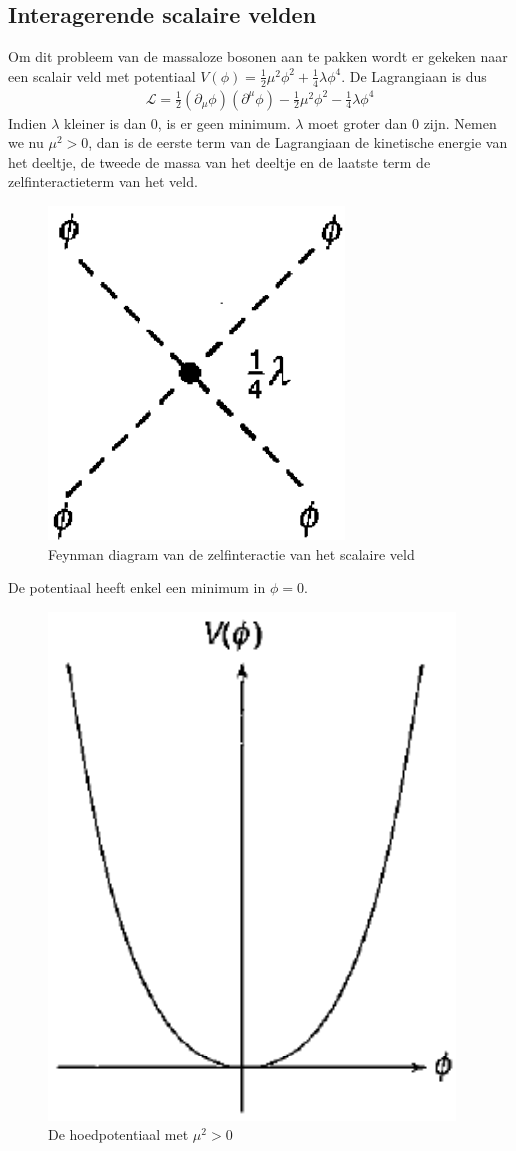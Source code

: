 \documentclass[../main.tex]{subfiles}
\begin{document}
\subsection{Interagerende scalaire velden}%
\label{sub:interagerende_scalaire_velden}

Om dit probleem van de massaloze bosonen aan te pakken wordt er gekeken naar een scalair veld met potentiaal $V(\phi) = \frac{1}{2}\mu^2\phi^2+\frac{1}{4}\lambda\phi^4$. De Lagrangiaan is dus
\begin{equation}
    \begin{aligned}
        \label{eq:lagr_hoed_pot}
        \mathcal{L} = \frac{1}{2} (\partial_\mu \phi) (\partial^\mu \phi) - \frac{1}{2} \mu^2 \phi^2 - \frac{1}{4} \lambda \phi^4
    \end{aligned}
\end{equation}
Indien $\lambda$ kleiner is dan 0, is er geen minimum. $\lambda$ moet groter dan 0 zijn. Nemen we nu $\mu^2>0$, dan is de eerste term van de Lagrangiaan de kinetische energie van het deeltje, de tweede de massa van het deeltje en de laatste term de zelfinteractieterm van het veld.\newpage

\begin{figure}[h]
    \centering
    \includegraphics[width=0.2\linewidth]{higgs_boson/zelf_int_term_scal.png}
    \caption{Feynman diagram van de zelfinteractie van het scalaire veld}%
    \label{fig:higgs_boson/zelf_int_term_scal}
\end{figure}

De potentiaal heeft enkel een minimum in $\phi=0$.

\begin{figure}[h]
    \centering
    \includegraphics[width=0.2\linewidth]{higgs_boson/hoed_pot_1.png}
    \caption{De hoedpotentiaal met $\mu^2>0$}%
    \label{fig:higgs_boson/hoed_pot_1}
\end{figure}
\end{document}
